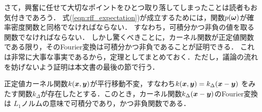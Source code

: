さて，興奮に任せて大切なポイントをひとつ取り落してしまったことは読者もお気付きであろう．
式(\ref{eqn:rff_expectation})が成立するためには，関数$p(\boldsymbol{\omega})$が確率密度関数と同格でなければならない．
すなわち，可積分かつ非負の値を取る関数でなければならない．
しかし驚くべきことに，カーネル関数が正定値関数である限り，そのFourier変換は可積分かつ非負であることが証明できる．
これは非常に大事な事実であるから，定理としてまとめておく．ただし，議論の流れを妨げないよう証明は本文書の最後の節で行う．

\begin{theorem}[平行移動不変な正定値カーネルのFourier変換]
    正定値カーネル関数$k(\boldsymbol{x}, \boldsymbol{y})$が平行移動不変，すなわち$k(\boldsymbol{x}, \boldsymbol{y}) = k_{\Delta}(\boldsymbol{x} - \boldsymbol{y})$
    をみたす関数$k_{\Delta}$が存在したとする．このとき，カーネル関数$k_{\Delta}(\boldsymbol{x} - \boldsymbol{y})$のFourier変換は
    $L_1$ノルムの意味で可積分であり，かつ非負関数である．
\end{theorem}

